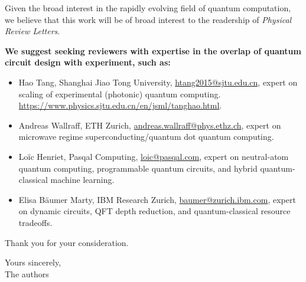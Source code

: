\documentclass[11pt]{letter}
\newcommand{\Journal}{\textit{Physical Review Letters}}
\begin{document}
\begin{letter}{}
Given the broad interest in the rapidly evolving field of quantum computation, we believe that this work will be of broad interest to the readership of \Journal.

\textbf{We suggest seeking reviewers with expertise in the overlap of quantum circuit design with experiment, such as:}
\begin{itemize}
    \item Hao Tang, Shanghai Jiao Tong University, \url{htang2015@sjtu.edu.cn}, expert on scaling of experimental (photonic) quantum computing. \url{https://www.physics.sjtu.edu.cn/en/jsml/tanghao.html}.
    \item Andreas Wallraff, ETH Zurich, \url{andreas.wallraff@phys.ethz.ch}, expert on microwave regime superconducting/quantum dot quantum computing. 
    \item Loïc Henriet, Pasqal Computing, \url{loic@pasqal.com}, expert on neutral-atom quantum computing, programmable quantum circuits, and hybrid quantum-classical machine learning.
    \item Elisa Bäumer Marty, IBM Research Zurich, \url{baumer@zurich.ibm.com}, expert on dynamic circuits, QFT depth reduction, and quantum-classical resource tradeoffs.
\end{itemize}

Thank you for your consideration.

\noindent Yours sincerely,\\
The authors

\end{letter}
\end{document}
